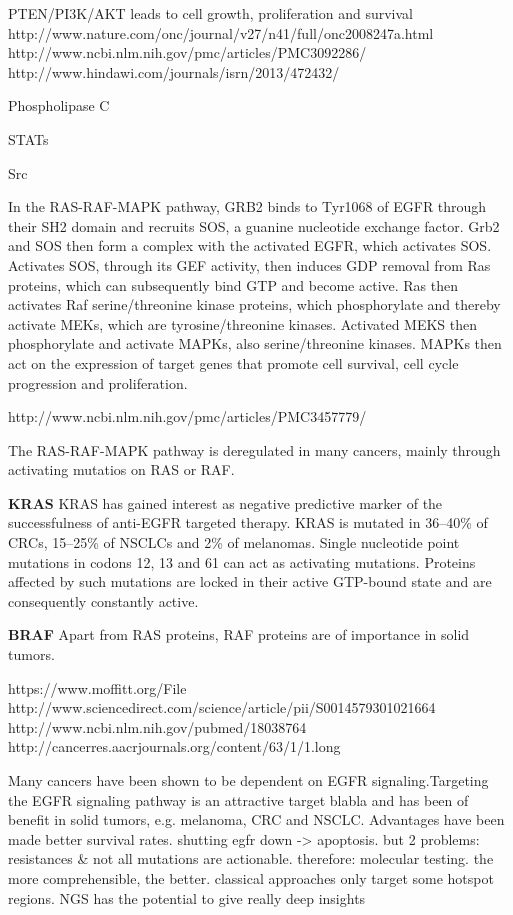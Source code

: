       PTEN/PI3K/AKT leads to cell growth, proliferation and survival
      http://www.nature.com/onc/journal/v27/n41/full/onc2008247a.html
      http://www.ncbi.nlm.nih.gov/pmc/articles/PMC3092286/
      http://www.hindawi.com/journals/isrn/2013/472432/

      Phospholipase C

      STATs

      Src

      In the RAS-RAF-MAPK pathway, GRB2 binds to Tyr1068 of EGFR through their
      SH2 domain and recruits SOS, a guanine nucleotide exchange factor. Grb2
      and SOS then form a complex with the activated EGFR, which activates SOS.
      Activates SOS, through its GEF activity, then induces GDP removal from Ras
      proteins, which can subsequently bind GTP and become active. Ras then
      activates Raf serine/threonine kinase proteins, which phosphorylate and
      thereby activate MEKs, which are tyrosine/threonine kinases. Activated
      MEKS then phosphorylate and activate MAPKs, also serine/threonine kinases.
      MAPKs then act on the expression of target genes that promote cell survival,
      cell cycle progression and proliferation.

      http://www.ncbi.nlm.nih.gov/pmc/articles/PMC3457779/

      The RAS-RAF-MAPK pathway is deregulated in many cancers, mainly through
      activating mutatios on RAS or RAF.

      \textbf{KRAS}
      KRAS has gained interest as negative predictive
      marker of the successfulness of anti-EGFR targeted therapy. KRAS is
      mutated in 36--40\% of CRCs, 15--25\% of NSCLCs and 2\% of melanomas.
      Single nucleotide point mutations in codons 12, 13 and 61 can act as
      activating mutations. Proteins affected by such mutations are locked in
      their active GTP-bound state and are consequently constantly active.

      \textbf{BRAF}
      Apart from RAS proteins, RAF proteins are of importance in solid tumors.

      https://www.moffitt.org/File%
      http://www.sciencedirect.com/science/article/pii/S0014579301021664
      http://www.ncbi.nlm.nih.gov/pubmed/18038764
      http://cancerres.aacrjournals.org/content/63/1/1.long

      Many cancers have been shown to be dependent on EGFR signaling.Targeting
      the EGFR signaling pathway is an attractive target blabla and has been of
      benefit in solid tumors, e.g. melanoma, CRC and NSCLC. Advantages have
      been made better survival rates. shutting egfr down -> apoptosis. but 2
      problems: resistances & not all mutations are actionable. therefore:
      molecular testing. the more comprehensible, the better. classical
      approaches only target some hotspot regions. NGS has the potential to give
      really deep insights

